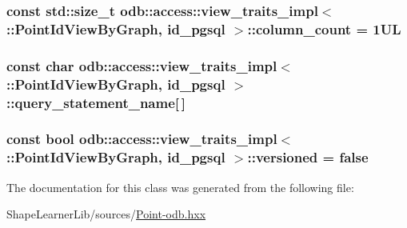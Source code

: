 \subsubsection[{column\+\_\+count}]{\setlength{\rightskip}{0pt plus 5cm}const std\+::size\+\_\+t odb\+::access\+::view\+\_\+traits\+\_\+impl$<$ \+::{\bf Point\+Id\+View\+By\+Graph}, id\+\_\+pgsql $>$\+::column\+\_\+count = 1\+U\+L\hspace{0.3cm}{\ttfamily [static]}}\label{classodb_1_1access_1_1view__traits__impl_3_01_1_1_point_id_view_by_graph_00_01id__pgsql_01_4_a19357acd84391058f5f58024a5828012}
\hypertarget{classodb_1_1access_1_1view__traits__impl_3_01_1_1_point_id_view_by_graph_00_01id__pgsql_01_4_aa27069d412a34e213b15033893d16684}{}
\subsubsection[{query\+\_\+statement\+\_\+name}]{\setlength{\rightskip}{0pt plus 5cm}const char odb\+::access\+::view\+\_\+traits\+\_\+impl$<$ \+::{\bf Point\+Id\+View\+By\+Graph}, id\+\_\+pgsql $>$\+::query\+\_\+statement\+\_\+name\mbox{[}$\,$\mbox{]}\hspace{0.3cm}{\ttfamily [static]}}\label{classodb_1_1access_1_1view__traits__impl_3_01_1_1_point_id_view_by_graph_00_01id__pgsql_01_4_aa27069d412a34e213b15033893d16684}
\hypertarget{classodb_1_1access_1_1view__traits__impl_3_01_1_1_point_id_view_by_graph_00_01id__pgsql_01_4_ac17ca3cb8a238e5b22e407829593ddd0}{}
\subsubsection[{versioned}]{\setlength{\rightskip}{0pt plus 5cm}const bool odb\+::access\+::view\+\_\+traits\+\_\+impl$<$ \+::{\bf Point\+Id\+View\+By\+Graph}, id\+\_\+pgsql $>$\+::versioned = false\hspace{0.3cm}{\ttfamily [static]}}\label{classodb_1_1access_1_1view__traits__impl_3_01_1_1_point_id_view_by_graph_00_01id__pgsql_01_4_ac17ca3cb8a238e5b22e407829593ddd0}


The documentation for this class was generated from the following file\+:\begin{DoxyCompactItemize}
\item 
Shape\+Learner\+Lib/sources/\hyperlink{_point-odb_8hxx}{Point-\/odb.\+hxx}\end{DoxyCompactItemize}
